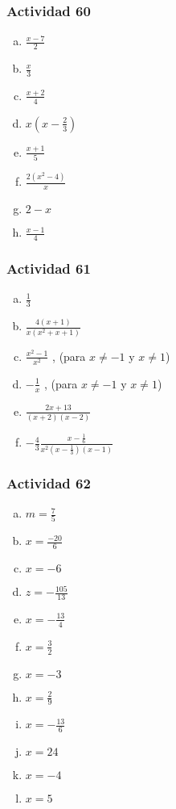 \documentclass[a4paper, twocolumn]{article}
\begin{document}
\subsubsection*{Actividad 60}
\begin{enumerate}[a)]
\item $\frac{x-7}{2}$
\item $\frac{x}{3}$
\item $\frac{x+2}{4}$
\item $x(x-\frac{2}{3})$
\item $\frac{x+1}{5}$
\item $\frac{2(x^2-4)}{x}$
\item $2-x$
\item $\frac{x-1}{4}$
\end{enumerate}

\subsubsection*{Actividad 61}
\begin{enumerate}[a)]
\item $\frac{1}{3}$
\item $\frac{4(x+1)}{x(x^2+x+1)}$
\item $\frac{x^2 -1}{x^2}$ , (para $x \neq-1 $ y $ x\neq1$) 
\item $-\frac{1}{x}$ , (para $x \neq-1 $ y $x\neq1$)
\item $\frac{2x+13}{(x+2)(x-2)}$
\item $-\frac{4}{3}\frac{x-\frac{1}{6}}{x^2(x-\frac{1}{3})(x-1)}$
\end{enumerate}

\subsubsection*{Actividad 62}
\begin{enumerate}[a)]
\item $m=\frac{7}{5}$
\item $x=\frac{-20}{6}$
\item $x=-6$
\item $z=-\frac{105}{13}$
\item $x=-\frac{13}{4}$
\item $x=\frac{3}{2}$
\item $x=-3$
\item $x=\frac{2}{9}$
\item $x=-\frac{13}{6}$
\item $x=24$
\item $x=-4$
\item $x=5$
\end{enumerate}
\end{document}
